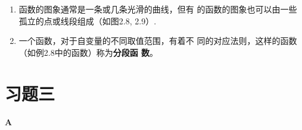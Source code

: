 \begin{note}
\begin{enumerate}
    \item  函数的图象通常是一条或几条光滑的曲线，但有
    的函数的图象也可以由一些孤立的点或线段组成（如图2.8, 
    2.9）.
    \item 一个函数，对于自变量的不同取值范围，有着不
    同的对应法则，这样的函数（如例2.8中的函数）称为\textbf{分段函
    数}。
\end{enumerate}
\end{note}

\section*{习题三}
\begin{center}
    \bfseries A
\end{center}

